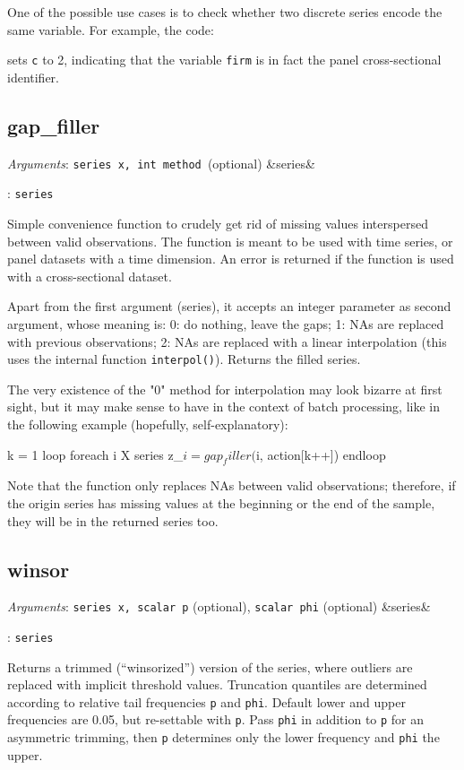 \documentclass[11pt,english]{article}
\newcommand{\ArgRet}[2]{%
  {\it Arguments}: {#1}%
  \ifx&#2&%
  \else
  \par\smallskip\noindent {\it Return type}: \texttt{#2}
  \fi%
  \par\medskip\par%
  }
\begin{document}
One of the possible use cases is to check whether two discrete series encode
the same variable. For example, the code:
sets \texttt{c} to 2, indicating that the variable \texttt{firm} is in fact the
panel cross-sectional identifier.

\subsection{gap\_filler}

\ArgRet{\texttt{series x, int method }(optional)}{series}

Simple convenience function to crudely get rid of missing values
interspersed between valid observations. The function is meant to be
used with time series, or panel datasets with a time dimension. An
error is returned if the function is used with a cross-sectional
dataset.

Apart from the first argument (series), it accepts an integer
parameter as second argument, whose meaning is: 0: do nothing, leave
the gaps; 1: NAs are replaced with previous observations; 2: NAs are
replaced with a linear interpolation (this uses the internal function
\texttt{interpol()}). Returns the filled series.

The very existence of the "0" method for interpolation may look
bizarre at first sight, but it may make sense to have in the context
of batch processing, like in the following example (hopefully,
self-explanatory):
\begin{code}
k = 1
loop foreach i X
   series z_$i = gap_filler($i, action[k++])
endloop
\end{code}

Note that the function only replaces NAs between valid observations;
therefore, if the origin series has missing values at the beginning or
the end of the sample, they will be in the returned series too.

\subsection{winsor}

\ArgRet{\texttt{series x, scalar p} (optional), \texttt{scalar
phi} (optional)}{series}

Returns a trimmed (``winsorized'') version
of the series, where outliers are replaced with implicit threshold
values. Truncation quantiles are determined according to relative
tail frequencies \texttt{p} and \texttt{phi}. Default lower and upper
frequencies are 0.05, but re-settable with \texttt{p}. Pass \texttt{phi}
in addition to \texttt{p} for an asymmetric trimming, then \texttt{p}
determines only the lower frequency and \texttt{phi} the upper.
\end{document}
